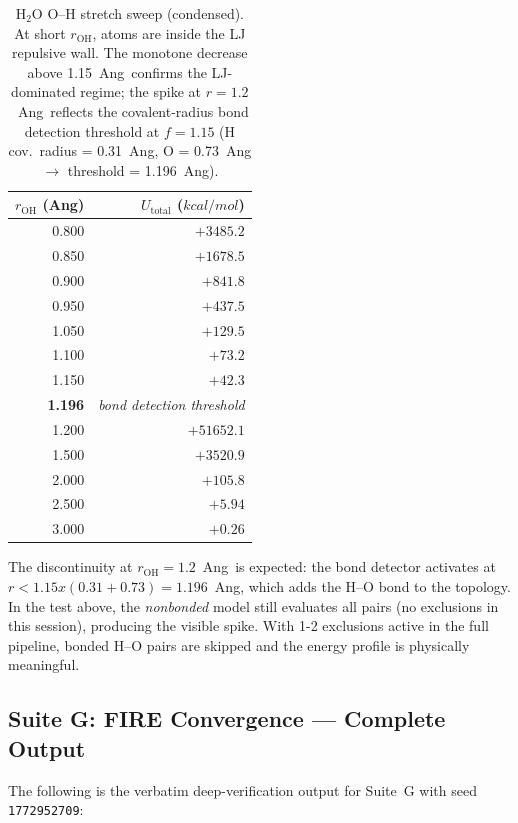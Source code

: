 \documentclass[11pt,twoside]{article}
\def\AA{Ang}%
\def\times{x}%
\def\kcalmol{kcal/mol}%
\newcommand{\kcalmol}{\text{kcal/mol}}
\begin{document}
\begin{table}[H]
\centering
\caption{H$_2$O O--H stretch sweep (condensed). At short $r_{\mathrm{OH}}$, atoms are inside the LJ repulsive wall. The monotone decrease above 1.15~\AA\ confirms the LJ-dominated regime; the spike at $r=1.2$~\AA\ reflects the covalent-radius bond detection threshold at $f = 1.15$ (H cov.\ radius = 0.31~\AA, O = 0.73~\AA $\rightarrow$ threshold = 1.196~\AA).}
\label{tab:oh-stretch}
\begin{tabular}{rr}
\toprule
$r_{\mathrm{OH}}$ (\AA) & $U_{\mathrm{total}}$ ($\kcalmol$) \\
\midrule
0.800 & $+3485.2$ \\
0.850 & $+1678.5$ \\
0.900 & $+841.8$ \\
0.950 & $+437.5$ \\
1.050 & $+129.5$ \\
1.100 & $+73.2$ \\
1.150 & $+42.3$ \\
\textbf{1.196} & \textit{bond detection threshold} \\
1.200 & $+51652.1$ \\
1.500 & $+3520.9$ \\
2.000 & $+105.8$ \\
2.500 & $+5.94$ \\
3.000 & $+0.26$ \\
\bottomrule
\end{tabular}
\end{table}

The discontinuity at $r_{\mathrm{OH}} = 1.2$~\AA\ is expected: the bond detector activates at $r < 1.15 \times (0.31 + 0.73) = 1.196$~\AA, which adds the H--O bond to the topology. In the test above, the \emph{nonbonded} model still evaluates all pairs (no exclusions in this session), producing the visible spike. With 1-2 exclusions active in the full pipeline, bonded H--O pairs are skipped and the energy profile is physically meaningful.

\subsection{Suite G: FIRE Convergence --- Complete Output}

The following is the verbatim deep-verification output for Suite~G with seed \texttt{1772952709}:
\end{document}
